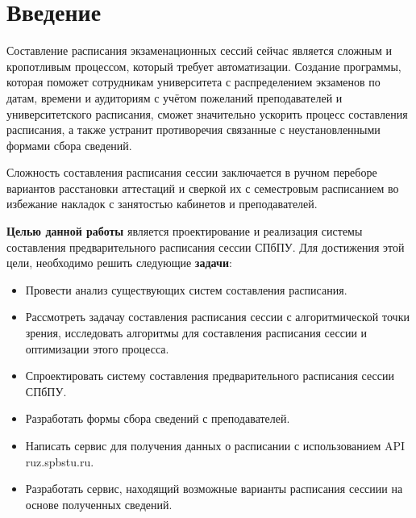 \chapter*{Введение} %

Составление расписания экзаменационных сессий сейчас является сложным и кропотливым процессом, который требует автоматизации. Создание программы, которая поможет сотрудникам университета с распределением экзаменов по датам, времени и аудиториям с учётом пожеланий преподавателей и университетского расписания, сможет значительно ускорить процесс составления расписания, а также устранит противоречия связанные с неустановленными формами сбора сведений. 

Сложность составления расписания сессии заключается в ручном переборе вариантов расстановки аттестаций и сверкой их с семестровым расписанием во избежание накладок с занятостью кабинетов и преподавателей. 

\textbf{Целью данной работы} является проектирование и реализация системы составления предварительного расписания сессии СПбПУ.
Для достижения этой цели, необходимо решить следующие \textbf{задачи}:

\begin{itemize}
	\item Провести анализ существующих систем составления расписания.
	\item Рассмотреть задачау составления расписания сессии с алгоритмической точки зрения, исследовать алгоритмы для составления расписания сессии и оптимизации этого процесса.
	\item Спроектировать систему составления предварительного расписания сессии СПбПУ.
	\item Разработать формы сбора сведений с преподавателей.
	\item Написать сервис для получения данных о расписании с использованием API ruz.spbstu.ru.
	\item Разработать сервис, находящий возможные варианты расписания сессиии на основе полученных сведений.
\end{itemize}

